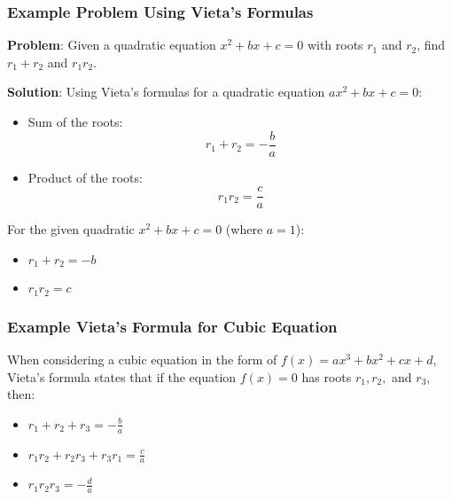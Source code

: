        \subsubsection*{Example Problem Using Vieta's Formulas}

        \textbf{Problem}: Given a quadratic equation \(x^2 + bx + c = 0\) with roots \(r_1\) and \(r_2\), find \(r_1 + r_2\) and \(r_1r_2\).

        \textbf{Solution}:
        Using Vieta's formulas for a quadratic equation \(ax^2 + bx + c = 0\):

        \begin{itemize}
            \item Sum of the roots:
            \[
            r_1 + r_2 = -\frac{b}{a}
            \]
            \item Product of the roots:
            \[
            r_1r_2 = \frac{c}{a}
            \]
        \end{itemize}

        For the given quadratic \(x^2 + bx + c = 0\) (where \(a = 1\)):

        \begin{itemize}
            \item \(r_1 + r_2 = -b\)
            \item \(r_1r_2 = c\)
        \end{itemize}

        \subsubsection*{Example Vieta's Formula for Cubic Equation}

        When considering a cubic equation in the form of \( f(x) = ax^3 + bx^2 + cx + d \), Vieta's formula states that if the equation \( f(x) = 0 \) has roots \( r_1, r_2, \) and \( r_3 \), then:

        \begin{itemize}
            \item \( r_1 + r_2 + r_3 = -\frac{b}{a} \)
            \item \( r_1r_2 + r_2r_3 + r_3r_1 = \frac{c}{a} \)
            \item \( r_1r_2r_3 = -\frac{d}{a} \)
        \end{itemize}



